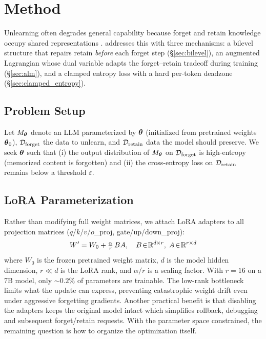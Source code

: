 \section{Method}
\label{sec:method}

Unlearning often degrades general capability because forget and retain knowledge occupy shared representations \citep{cheng2026unlearning, liu2025rethinking}.
\method addresses this with three mechanisms: a bilevel structure that repairs retain \emph{before} each forget step (\S\ref{sec:bilevel}), an augmented Lagrangian whose dual variable adapts the forget--retain tradeoff during training (\S\ref{sec:alm}), and a clamped entropy loss with a hard per-token deadzone (\S\ref{sec:clamped_entropy}).

\subsection{Problem Setup}

Let $M_{\boldsymbol{\theta}}$ denote an LLM parameterized by $\boldsymbol{\theta}$ (initialized from pretrained weights $\boldsymbol{\theta}_0$), $\mathcal{D}_\text{forget}$ the data to unlearn, and $\mathcal{D}_\text{retain}$ data the model should preserve.
We seek $\boldsymbol{\theta}$ such that (i) the output distribution of $M_{\boldsymbol{\theta}}$ on $\mathcal{D}_\text{forget}$ is high-entropy (memorized content is forgotten) and (ii) the cross-entropy loss on $\mathcal{D}_\text{retain}$ remains below a threshold $\varepsilon$.

\subsection{LoRA Parameterization}
\label{sec:lora}

Rather than modifying full weight matrices, we attach LoRA adapters \citep{hu2022lora} to all projection matrices ($q$/$k$/$v$/$o$\_proj, gate/up/down\_proj):
\begin{equation}
    W' = W_0 + \tfrac{\alpha}{r}\, B A,\quad B \!\in\! \mathbb{R}^{d \times r},\; A \!\in\! \mathbb{R}^{r \times d}
    \label{eq:lora}
\end{equation}
where $W_0$ is the frozen pretrained weight matrix, $d$ is the model hidden dimension, $r \ll d$ is the LoRA rank, and $\alpha/r$ is a scaling factor.
With $r\!=\!16$ on a 7B model, only ${\sim}0.2\%$ of parameters are trainable.
The low-rank bottleneck limits what the update can express, preventing catastrophic weight drift even under aggressive forgetting gradients. Another practical benefit is that disabling the adapters keeps the original model intact which simplifies  rollback, debugging and subsequent forget/retain requests. With the parameter space constrained, the remaining question is how to organize the optimization itself.

